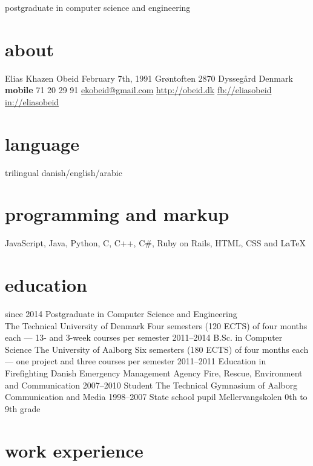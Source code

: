 \documentclass[]{friggeri-cv}
\begin{document}
    {postgraduate in computer science and engineering}

\begin{aside}
  \section{about}
    Elias Khazen Obeid
    February 7th, 1991
    Grøntoften 
    2870 Dyssegård
    Denmark
    ~
    \textbf{mobile} 71 20 29 91
    \href{mailto:ekobeid@gmail.com}{ekobeid@gmail.com}
    \href{http://obeid.dk}{http://obeid.dk}
    \href{http://facebook.com/eliaskhazenobeid}{fb://eliasobeid}
    \href{http://www.linkedin.com/in/eliasobeid}{in://eliasobeid}
  \section{language}
    trilingual danish/english/arabic
  \section{programming and markup}
    JavaScript, Java,
    Python, C, C++, C\#,
    Ruby on Rails,
    HTML, CSS and \LaTeX{}
\end{aside}

\section{education}

\begin{entrylist}
  \entry
    {since 2014}
    {Postgraduate {\normalfont in Computer Science and Engineering}\\}
    {The Technical University of Denmark}
    {Four semesters (120 ECTS) of four months each --- 13- and 3-week courses per semester}
  \entry
    {2011–2014}
    {B.Sc. {\normalfont in Computer Science}}
    {The University of Aalborg}
    {Six semesters (180 ECTS) of four months each --- one project and three courses per semester}
  \entry
    {2011–2011}
    {Education in Firefighting}
    {Danish Emergency Management Agency}
    {Fire, Rescue, Environment and Communication}
  \entry
    {2007–2010}
    {Student}
    {The Technical Gymnasium of Aalborg}
    {Communication and Media}
  \entry
    {1998–2007}
    {State school pupil}
    {Mellervangskolen}
    {0th to 9th grade}
\end{entrylist}

\section{work experience}
\end{document}
